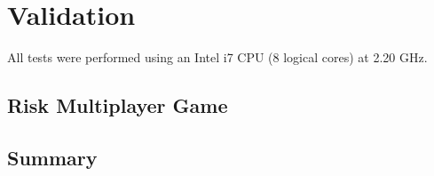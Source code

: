 \chapter{Validation}
\label{chap:validation}

All tests were performed using an Intel i7 CPU (8 logical cores) at 2.20 GHz. 





\section{Risk Multiplayer Game}

\section{Summary}
